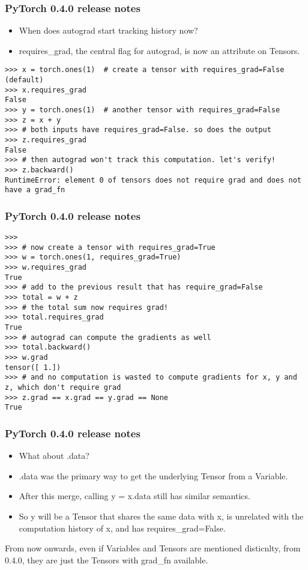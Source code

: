 \begin{frame}[fragile]
\frametitle{PyTorch 0.4.0 release notes}

\begin{itemize}
\item When does autograd start tracking history now?
\item requires\_grad, the central flag for autograd, is now an attribute on Tensors.
\end{itemize}
 \begin{lstlisting}
>>> x = torch.ones(1)  # create a tensor with requires_grad=False (default)
>>> x.requires_grad
False
>>> y = torch.ones(1)  # another tensor with requires_grad=False
>>> z = x + y
>>> # both inputs have requires_grad=False. so does the output
>>> z.requires_grad
False
>>> # then autograd won't track this computation. let's verify!
>>> z.backward()
RuntimeError: element 0 of tensors does not require grad and does not have a grad_fn
 \end{lstlisting}
 \end{frame} 
 
\begin{frame}[fragile]
\frametitle{PyTorch 0.4.0 release notes}

 \begin{lstlisting}
>>>
>>> # now create a tensor with requires_grad=True
>>> w = torch.ones(1, requires_grad=True)
>>> w.requires_grad
True
>>> # add to the previous result that has require_grad=False
>>> total = w + z
>>> # the total sum now requires grad!
>>> total.requires_grad
True
>>> # autograd can compute the gradients as well
>>> total.backward()
>>> w.grad
tensor([ 1.])
>>> # and no computation is wasted to compute gradients for x, y and z, which don't require grad
>>> z.grad == x.grad == y.grad == None
True
 \end{lstlisting}
 \end{frame} 
 
\begin{frame}[fragile]
\frametitle{PyTorch 0.4.0 release notes}

\begin{itemize}
\item What about .data?
\item .data was the primary way to get the underlying Tensor from a Variable. 
\item After this merge, calling y = x.data still has similar semantics.
\item So y will be a Tensor that shares the same data with x, is unrelated with the computation history of x, and has requires\_grad=False.
\end{itemize}

From now onwards, even if Variables and Tensors are mentioned disticnlty, from 0.4.0, they are just the Tensors with grad\_fn available.
\end{frame} 
 
